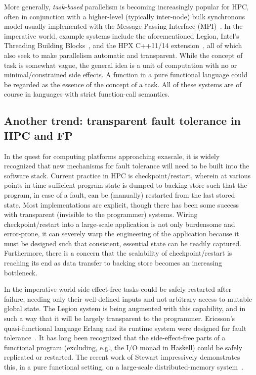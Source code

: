 \documentclass{llncs}
\begin{document}
More generally, \emph{task-based} parallelism is becoming increasingly popular
for HPC, often in conjunction with a higher-level (typically inter-node) bulk
synchronous model usually implemented with the Message Passing Interface
(MPI)~\cite{MPI}\@.  In the imperative world, example systems include the
aforementioned Legion, Intel's Threading Building Blocks~\cite{Reinders:2007},
and the HPX C++11/14 extension~\cite{HPX}, all of which also seek to
make parallelism automatic and transparent.  While the concept of task is
somewhat vague, the general idea is a unit of computation with no or
minimal/constrained side effects.  A function in a pure functional language
could be regarded as the essence of the concept of a task.  All of these
systems are of course in languages with strict function-call semantics.

\subsection{Another trend: transparent fault tolerance in HPC and FP}
In the quest for computing platforms approaching exascale, it is widely
recognized that new mechanisms for fault tolerance will need to be built into
the software stack.  Current practice in HPC is checkpoint/restart, wherein at
various points in time sufficient program state is dumped to backing store
such that the program, in case of a fault, can be (manually) restarted from
the last stored state.  Most implementations are explicit, though there has
been some success with transparent (invisible to the programmer) systems.
Wiring checkpoint/restart into a large-scale application is not only
burdensome and error-prone, it can severely warp the engineering of the
application because it must be designed such that consistent, essential state
can be readily captured.  Furthermore, there is a concern that the scalability
of checkpoint/restart is reaching its end as data transfer to backing store
becomes an increasing bottleneck.

In the imperative world side-effect-free tasks could be safely restarted after
failure, needing only their well-defined inputs and not arbitrary access to
mutable global state.  The Legion system is being augmented with this
capability, and in such a way that it will be largely transparent to the
programmer.  Ericsson's quasi-functional language Erlang and its runtime
system were designed for fault tolerance~\cite{Cesarini:2009}.  It has long
been recognized that the side-effect-free parts of a functional program
(excluding, e.g., the I/O monad in Haskell) could be safely replicated or
restarted.  The recent work of Stewart impressively demonstrates this, in a
pure functional setting, on a large-scale distributed-memory
system~\cite{Stewart:2013}.
\end{document}
